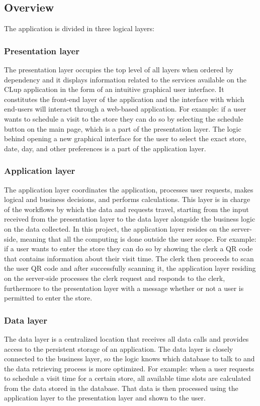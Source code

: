 \subsection{Overview}
The application is divided in three logical layers:
\subsubsection{Presentation layer}
The presentation layer occupies the top level of all layers when ordered by dependency and it displays information related to the services available on the CLup application in the form of an intuitive graphical user interface.
It constitutes the front-end layer of the application and the interface with which end-users will interact through a web-based application.
For example: if a user wants to schedule a visit to the store they can do so by selecting the schedule button on the main page, which is a part of the presentation layer.
The logic behind opening a new graphical interface for the user to select the exact store, date, day, and other preferences is a part of the application layer.
\subsubsection{Application layer}
The application layer coordinates the application, processes user requests, makes logical and business decisions, and performs calculations.
This layer is in charge of the workflows by which the data and requests travel, starting from the input received from the presentation layer
to the data layer alongside the business logic on the data collected.
In this project, the application layer resides on the server-side, meaning that all the computing is done outside the user scope.
For example: if a user wants to enter the store they can do so by showing the clerk a QR code that contains information about their visit time.
The clerk then proceeds to scan the user QR code and after successfully scanning it, the application layer residing on the server-side processes
the clerk request and responds to the clerk, furthermore to the presentation layer with a message whether or not a user is permitted to enter the store.
\subsubsection{Data layer}
The data layer is a centralized location that receives all data calls and provides access to the persistent storage of an application.
The data layer is closely connected to the business layer, so the logic knows which database to talk to and the data retrieving process is more optimized.
For example: when a user requests to schedule a visit time for a certain store, all available time slots are calculated from the data stored in the database.
That data is then processed using the application layer to the presentation layer and shown to the user.


